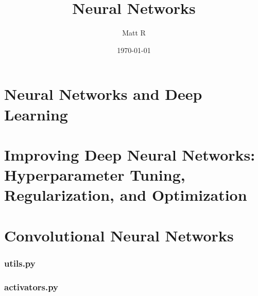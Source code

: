 \documentclass[12pt]{article}
\title{Neural Networks}
\author{Matt R}
\date{\today}
\numberwithin{equation}{section}%
\let\oldpart\part
\renewcommand\part{\newpage\oldpart}
\begin{document}
	\maketitle
	\tableofcontents
	
	\part{Neural Networks and Deep Learning}
		
		
		

	\part{Improving Deep Neural Networks: Hyperparameter Tuning, Regularization, and Optimization}
		
		
		
		
		
		
		
		
		
		
	\part{Convolutional Neural Networks}
		
		

		
	\begin{appendices}
		\section{utils.py}
		
		\section{activators.py}
		
		
		

	\end{appendices}


	
	
\end{document}
